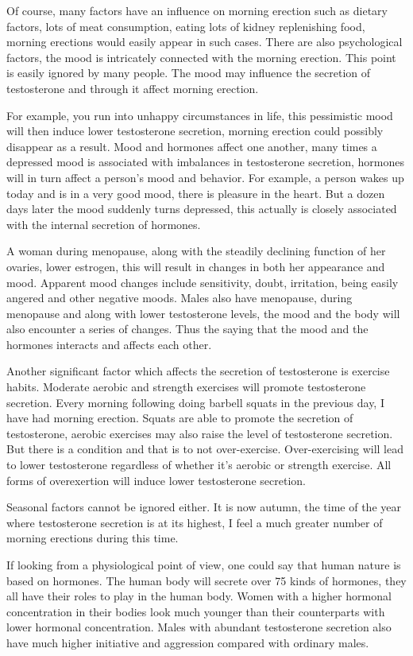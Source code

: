 \documentclass[
]{book}
\begin{document}
Of course, many factors have an influence on morning erection such as dietary factors, lots of meat consumption, eating lots of kidney replenishing food, morning erections would easily appear in such cases. There are also psychological factors, the mood is intricately connected with the morning erection. This point is easily ignored by many people. The mood may influence the secretion of testosterone and through it affect morning erection.

For example, you run into unhappy circumstances in life, this pessimistic mood will then induce lower testosterone secretion, morning erection could possibly disappear as a result. Mood and hormones affect one another, many times a depressed mood is associated with imbalances in testosterone secretion, hormones will in turn affect a person's mood and behavior. For example, a person wakes up today and is in a very good mood, there is pleasure in the heart. But a dozen days later the mood suddenly turns depressed, this actually is closely associated with the internal secretion of hormones.

A woman during menopause, along with the steadily declining function of her ovaries, lower estrogen, this will result in changes in both her appearance and mood. Apparent mood changes include sensitivity, doubt, irritation, being easily angered and other negative moods. Males also have menopause, during menopause and along with lower testosterone levels, the mood and the body will also encounter a series of changes. Thus the saying that the mood and the hormones interacts and affects each other.

Another significant factor which affects the secretion of testosterone is exercise habits. Moderate aerobic and strength exercises will promote testosterone secretion. Every morning following doing barbell squats in the previous day, I have had morning erection. Squats are able to promote the secretion of testosterone, aerobic exercises may also raise the level of testosterone secretion. But there is a condition and that is to not over-exercise. Over-exercising will lead to lower testosterone regardless of whether it's aerobic or strength exercise. All forms of overexertion will induce lower testosterone secretion.

Seasonal factors cannot be ignored either. It is now autumn, the time of the year where testosterone secretion is at its highest, I feel a much greater number of morning erections during this time.

If looking from a physiological point of view, one could say that human nature is based on hormones. The human body will secrete over 75 kinds of hormones, they all have their roles to play in the human body. Women with a higher hormonal concentration in their bodies look much younger than their counterparts with lower hormonal concentration. Males with abundant testosterone secretion also have much higher initiative and aggression compared with ordinary males.
\end{document}
